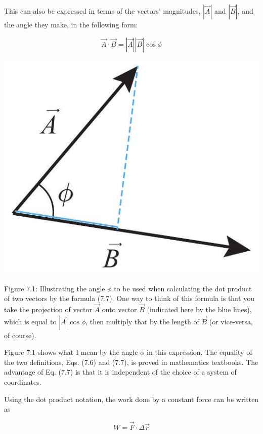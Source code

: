 \documentclass[10pt]{article}
\begin{document}
This can also be expressed in terms of the vectors' magnitudes, $|\vec{A}|$ and $|\vec{B}|$, and the angle they make, in the following form:


\begin{equation*}
\vec{A} \cdot \vec{B}=|\vec{A}||\vec{B}| \cos \phi \tag{7.7}
\end{equation*}


\begin{center}
\includegraphics[max width=\textwidth]{2024_09_14_9969b06773f10b6936e8g-157}
\end{center}

Figure 7.1: Illustrating the angle $\phi$ to be used when calculating the dot product of two vectors by the formula (7.7). One way to think of this formula is that you take the projection of vector $\vec{A}$ onto vector $\vec{B}$ (indicated here by the blue lines), which is equal to $|\vec{A}| \cos \phi$, then multiply that by the length of $\vec{B}$ (or vice-versa, of course).

Figure 7.1 shows what I mean by the angle $\phi$ in this expression. The equality of the two definitions, Eqs. (7.6) and (7.7), is proved in mathematics textbooks. The advantage of Eq. (7.7) is that it is independent of the choice of a system of coordinates.

Using the dot product notation, the work done by a constant force can be written as


\begin{equation*}
W=\vec{F} \cdot \Delta \vec{r} \tag{7.8}
\end{equation*}
\end{document}
